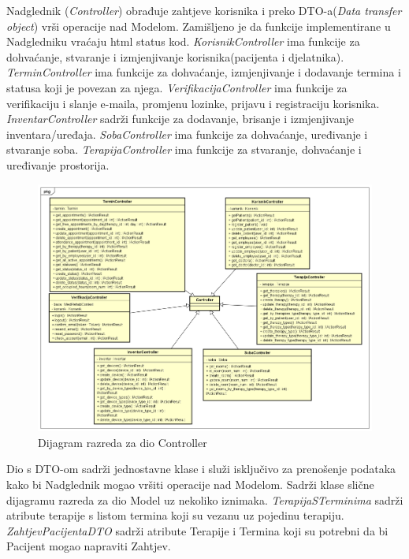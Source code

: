 			Nadglednik (\textit{Controller}) obrađuje zahtjeve korisnika i preko DTO-a(\textit{Data transfer object}) vrši operacije nad Modelom. Zamišljeno je da funkcije implementirane u Nadgledniku vraćaju html status kod. \textit{KorisnikController} ima funkcije za dohvaćanje, stvaranje i izmjenjivanje korisnika(pacijenta i djelatnika). \textit{TerminController} ima funkcije za dohvaćanje, izmjenjivanje i dodavanje termina i statusa koji je povezan za njega. \textit{VerifikacijaController} ima funkcije za verifikaciju i slanje e-maila, promjenu lozinke, prijavu i registraciju korisnika. \textit{InventarController} sadrži funkcije za dodavanje, brisanje i izmjenjivanje inventara/uređaja. \textit{SobaController} ima funkcije za dohvaćanje, uređivanje i stvaranje soba. \textit{TerapijaController} ima funkcije za stvaranje, dohvaćanje i uređivanje prostorija.
			\begin{figure}[H]
				\includegraphics[scale=0.41]{slike/Dijagram_razreda_1.PNG} %
				\centering
				\caption{Dijagram razreda za dio Controller}
				\label{fig:dijagram_razreda_1}
			\end{figure}
			
			Dio s DTO-om sadrži jednostavne klase i služi isključivo za prenošenje podataka kako bi Nadglednik mogao vršiti operacije nad Modelom. Sadrži klase slične dijagramu razreda za dio Model uz nekoliko iznimaka. \textit{TerapijaSTerminima} sadrži atribute terapije s listom termina koji su vezanu uz pojedinu terapiju. \textit{ZahtjevPacijentaDTO} sadrži atribute Terapije i Termina koji su potrebni da bi Pacijent mogao napraviti Zahtjev.
			
